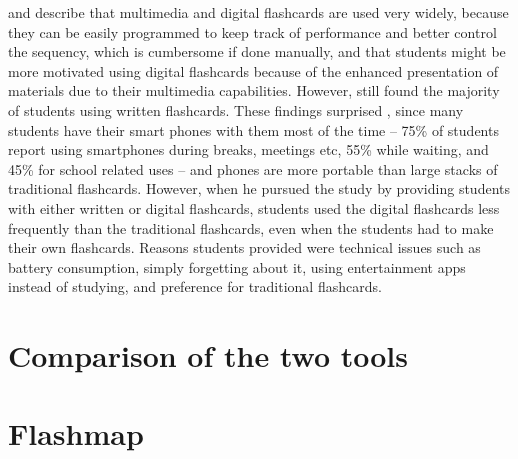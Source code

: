  and  describe that multimedia and digital flashcards are used very widely, because they can be easily programmed to keep track of performance and better control the sequency, which is cumbersome if done manually, and that students might be more motivated using digital flashcards because of the enhanced presentation of materials due to their multimedia capabilities. However,  still found the majority of students using written flashcards. These findings surprised , since many students have their smart phones with them most of the time -- 75\% of students report using smartphones during breaks, meetings etc, 55\% while waiting, and 45\% for school related uses -- and phones are more portable than large stacks of traditional flashcards. However, when he pursued the study by providing students with either written or digital flashcards, students used the digital flashcards less frequently than the traditional flashcards, even when the students had to make their own flashcards. Reasons students provided were technical issues such as battery consumption, simply forgetting about it, using entertainment apps instead of studying, and preference for traditional flashcards.


\section{Comparison of the two tools}




\section{Flashmap}



